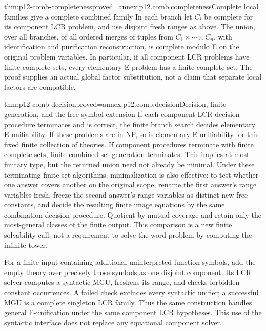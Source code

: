 \begin{hbtheorem}{thm:p12-comb-completeness}{proved=annex:p12.comb.completeness}{Complete local families give a complete combined family}
In each branch let \(C_i\) be complete for its component LCR problem,
and use disjoint fresh ranges as above. The union, over all branches,
of all ordered merges of tuples from \(C_1\times\cdots\times C_n\),
with identification and purification reconstruction, is complete modulo E
on the original problem variables. In particular, if all component LCR
problems have finite complete sets, every elementary E-problem has a
finite complete set. The proof supplies an actual global factor
substitution, not a claim that separate local factors are compatible.
\end{hbtheorem}

\begin{hbtheorem}{thm:p12-comb-decision}{proved=annex:p12.comb.decision}{Decision, finite generation, and the free-symbol extension}
If each component LCR decision procedure terminates and is correct,
the finite branch search decides elementary E-unifiability. If these
problems are in NP, so is elementary E-unifiability for this fixed
finite collection of theories. If component procedures terminate with
finite complete sets, finite combined-set generation terminates.
This implies at-most-finitary type, but the returned union need not
already be minimal. Under these terminating finite-set algorithms,
minimalization is also effective: to test whether one answer covers
another on the original scope, rename the first answer's range variables
fresh, freeze the second answer's range variables as distinct new
free constants, and decide the resulting finite image equations by
the same combination decision procedure. Quotient by mutual coverage
and retain only the most-general classes of the finite output.
This comparison is a new finite solvability call, not a requirement
to solve the word problem by computing the infinite tower.

For a finite input containing additional uninterpreted function symbols,
add the empty theory over precisely those symbols as one disjoint
component. Its LCR solver computes a syntactic MGU, freshens its range,
and checks forbidden-constant occurrences. A failed check excludes every
syntactic unifier; a successful MGU is a complete singleton LCR family.
Thus the same construction handles general E-unification under the
same component LCR hypotheses. This use of the syntactic interface
does not replace any equational component solver.
\cite[Proposition~6.1 and Theorems~6.2--6.3, pp.~516--517]{BaaderSnyder2001}
\end{hbtheorem}


